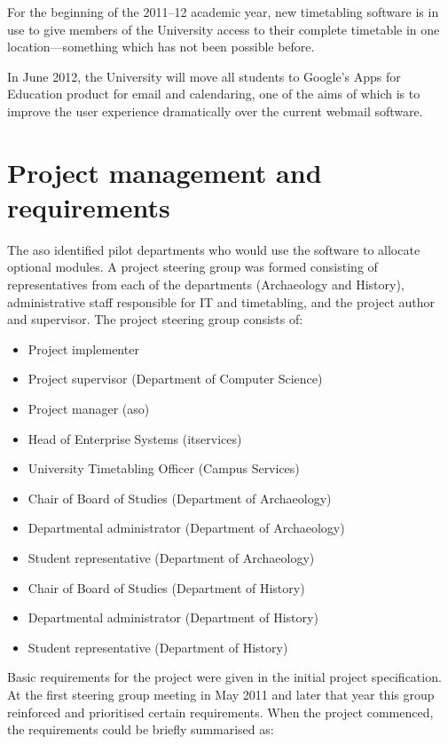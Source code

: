 \documentclass[draft]{scrartcl}
\begin{document}
For the beginning of the 2011--12 academic year, new timetabling software is in
use to give members of the University access to their complete timetable in
one location---something which has not been possible before.

In June 2012, the University will move all students to Google's Apps for
Education product for email and calendaring, one of the aims of which is to
improve the user experience dramatically over the current webmail software.

\section{Project management and requirements}
\label{sec:requirements}

The \gls{aso} identified pilot departments who would use the software to
allocate optional modules. A project steering group was formed consisting of
representatives from each of the departments (Archaeology and History),
administrative staff responsible for IT and timetabling, and the project
author and supervisor. The project steering group consists of:

\begin{itemize}
  \item Project implementer
  \item Project supervisor (Department of Computer Science)
  \item Project manager (\gls{aso})
  \item Head of Enterprise Systems (\gls{itservices})
  \item University Timetabling Officer (Campus Services)
  \item Chair of Board of Studies (Department of Archaeology)
  \item Departmental administrator (Department of Archaeology)
  \item Student representative (Department of Archaeology)
  \item Chair of Board of Studies (Department of History)
  \item Departmental administrator (Department of History)
  \item Student representative (Department of History)
\end{itemize}

Basic requirements for the project were given in the initial project
specification. At the first steering group meeting in May 2011 and later that
year this group reinforced and prioritised certain requirements. When the
project commenced, the requirements could be briefly summarised as:
\end{document}
